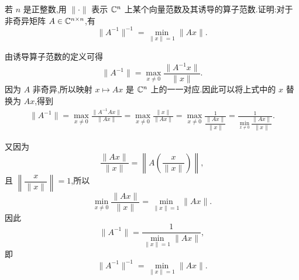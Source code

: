 \begin{problem}
若 $n$ 是正整数,用 $\|\cdot\|$ 表示 $\mathbb{C}^n$ 上某个向量范数及其诱导的算子范数.证明:对于非奇异矩阵 $A\in\mathbb{C}^{n\times n}$,有
\[
    \|A^{-1}\|^{-1}=\min_{\|x\|=1}\|Ax\|.
\]
\begin{solution}
    由诱导算子范数的定义可得
    \[
        \|A^{-1}\|
        =\max_{x\ne 0}\frac{\|A^{-1}x\|}{\|x\|}.
    \]
    因为 $A$ 非奇异,所以映射 $x \mapsto Ax$ 是 $\mathbb{C}^n$ 上的一一对应.因此可以将上式中的 $x$ 替换为 $Ax$,得到 
    \begin{align*}
        \|A^{-1}\|
        =\max_{x\ne0}\frac{\|A^{-1}Ax\|}{\|Ax\|}
        =\max_{x\ne0}\frac{\|x\|}{\|Ax\|}
        =\max_{x\ne0}\frac{1}{\dfrac{\|Ax\|}{\|x\|}}
        =\frac{1}{\min\limits_{x\ne0}\dfrac{\|Ax\|}{\|x\|}}.
    \end{align*}

    又因为
    \[
        \frac{\|Ax\|}{\|x\|}
        =\left\|A\left(\frac{x}{\|x\|}\right)\right\|,
    \]
    且 $\left\|\dfrac{x}{\|x\|}\right\|=1$,所以
    \[
        \min_{x\ne0}\frac{\|Ax\|}{\|x\|}
        =\min_{\|x\|=1}\|Ax\|.
    \]
    因此
    \[
        \|A^{-1}\|
        =\frac{1}{\min\limits_{\|x\|=1}\|Ax\|},
    \]
    即
    \[
        \|A^{-1}\|^{-1}=\min_{\|x\|=1}\|Ax\|.
    \]
\end{solution}
\end{problem}


